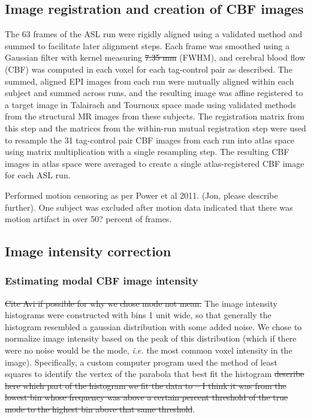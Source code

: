 \subsection{Image registration and creation of CBF images}
The 63 frames of the ASL run were rigidly aligned using a validated method\cite{Black_2001} and summed to facilitate later alignment steps. Each frame was smoothed using a Gaussian filter with kernel measuring \sout{7.35 mm} (FWHM), and cerebral blood flow (CBF) was computed in each voxel for each tag-control pair as described.\cite{Wang_2003} The summed, aligned EPI images from each run were mutually aligned within each subject and summed across runs, and the resulting image was affine registered to a target image in Talairach and Tournoux space made using validated methods from the structural MR images from these subjects.\cite{15130735} The registration matrix from this step and the matrices from the within-run mutual registration step were used to resample the 31 tag-control pair CBF images from each run into atlas space using matrix multiplication with a single resampling step. The resulting CBF images in atlas space were averaged to create a single atlas-registered CBF image for each ASL run. 

Performed motion censoring as per Power et al 2011. (Jon, please describe further). One subject was excluded after motion data indicated that there was motion artifact in over 50? percent of frames.

\subsection{Image intensity correction}
\subsubsection{Estimating modal CBF image intensity}
\sout{Cite Avi if possible for why we chose mode not mean.} The image intensity histograms were constructed with bins 1 unit wide, so that generally the histogram resembled a gaussian distribution with some added noise. We chose to normalize image intensity based on the peak of this distribution (which if there were no noise would be the mode, \textit{i.e.} the most common voxel intensity in the image). Specifically, a custom computer program used the method of least squares to identify the vertex of the parabola that best fit the histogram \sout{describe here which part of the histogram we fit the data to -- I think it was from the lowest bin whose frequency was above a certain percent threshold of the true mode to the highest bin above that same threshold}.
